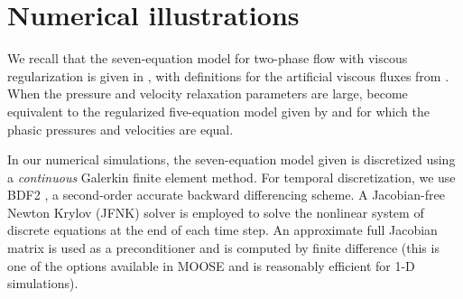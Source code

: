 \section{Numerical illustrations}\label{sec:num-ill}

We recall that the seven-equation model for two-phase flow with viscous regularization is given 
in , with definitions for the artificial viscous fluxes 
from . 
%
When the pressure and velocity relaxation parameters are large,  
become equivalent to the regularized five-equation model given by  and for which 
the phasic pressures and velocities are equal.


In our numerical simulations, the seven-equation model given is discretized using a \emph{continuous} Galerkin 
finite element method.  
For temporal discretization, we use BDF2 \cite{bdf2}, a second-order accurate backward differencing scheme. 
A Jacobian-free Newton Krylov (JFNK) solver is employed to solve the nonlinear system of discrete equations 
at the end of each time step. An approximate full Jacobian matrix is used as a preconditioner and is computed by finite difference 
(this is one of the options available in MOOSE and is reasonably efficient for 1-D simulations). 

